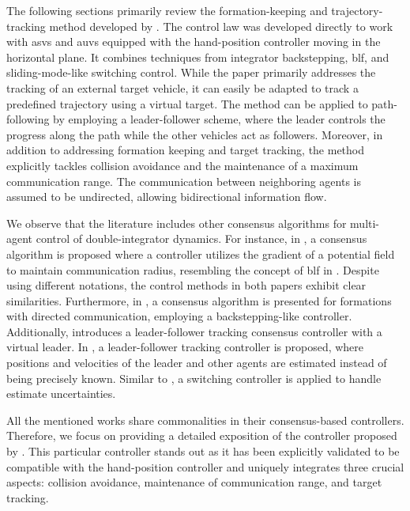 The following sections primarily review the formation-keeping and trajectory-tracking method developed by \cite{restrepo_tracking--formation_2022}. The control law was developed directly to work with \glspl{asv} and \glspl{auv} equipped with the hand-position controller moving in the horizontal plane. It combines techniques from integrator backstepping, \gls{blf}, and sliding-mode-like switching control. While the paper primarily addresses the tracking of an external target vehicle, it can easily be adapted to track a predefined trajectory using a virtual target. The method can be applied to path-following by employing a leader-follower scheme, where the leader controls the progress along the path while the other vehicles act as followers. Moreover, in addition to addressing formation keeping and target tracking, the method explicitly tackles collision avoidance and the maintenance of a maximum communication range. The communication between neighboring agents is assumed to be undirected, allowing bidirectional information flow.

We observe that the literature includes other consensus algorithms for multi-agent control of double-integrator dynamics. For instance, in \cite{miao_formation_2019}, a consensus algorithm is proposed where a controller utilizes the gradient of a potential field to maintain communication radius, resembling the concept of \gls{blf} in \cite{restrepo_tracking--formation_2022}. Despite using different notations, the control methods in both papers exhibit clear similarities. Furthermore, in \cite{montanez-molina_formation_2022}, a consensus algorithm is presented for formations with directed communication, employing a backstepping-like controller. Additionally, \cite{girejko_leader-following_2019} introduces a leader-follower tracking consensus controller with a virtual leader. In \cite{mohammadi_leader-following_2021}, a leader-follower tracking controller is proposed, where positions and velocities of the leader and other agents are estimated instead of being precisely known. Similar to \cite{restrepo_tracking--formation_2022}, a switching controller is applied to handle estimate uncertainties.


All the mentioned works share commonalities in their consensus-based controllers. Therefore, we focus on providing a detailed exposition of the controller proposed by \cite{restrepo_tracking--formation_2022}. This particular controller stands out as it has been explicitly validated to be compatible with the hand-position controller and uniquely integrates three crucial aspects: collision avoidance, maintenance of communication range, and target tracking.

